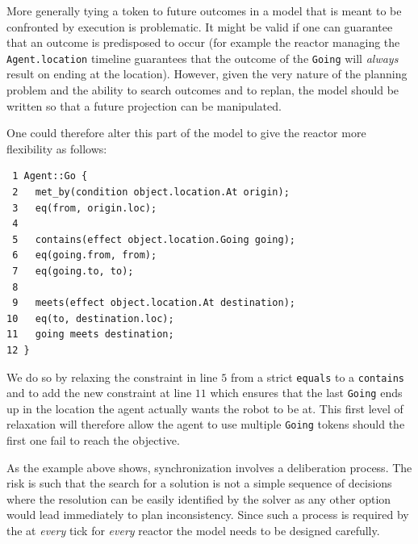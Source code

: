 More generally tying a token to future outcomes in a model that is
meant to be confronted by execution is problematic. It might be valid
if one can guarantee that an outcome is predisposed to occur (for
example the reactor managing the \texttt{Agent.location} timeline
guarantees that the outcome of the \texttt{Going} will {\em always}
result on ending at the  location). However, given
the very nature of the planning problem and the ability to search
outcomes and to replan, the model should be written so that a future
projection can be manipulated.

One could therefore alter this part of the model to give the reactor
more flexibility as follows:

\begin{verbatim}
 1 Agent::Go {
 2   met_by(condition object.location.At origin);
 3   eq(from, origin.loc);
 4
 5   contains(effect object.location.Going going);
 6   eq(going.from, from);
 7   eq(going.to, to);
 8   
 9   meets(effect object.location.At destination);
10   eq(to, destination.loc);
11   going meets destination;
12 }
\end{verbatim}

We do so by relaxing the constraint in line $5$ from a strict
\texttt{equals} to a \texttt{contains} and to add the new constraint
at line $11$ which ensures that the last \texttt{Going} ends up in the
location the agent actually wants the robot to be at. This first level
of relaxation will therefore allow the agent to use multiple
\texttt{Going} tokens should the first one fail to reach the
objective.  

As the example above shows, synchronization involves a deliberation
process. The risk is such that the search for a solution is not a
simple sequence of decisions where the resolution can be easily
identified by the solver as any other option would lead immediately to
plan inconsistency. Since such a process is required by the \rx at
\emph{every} tick for \emph{every} reactor the model needs to be
designed carefully.

